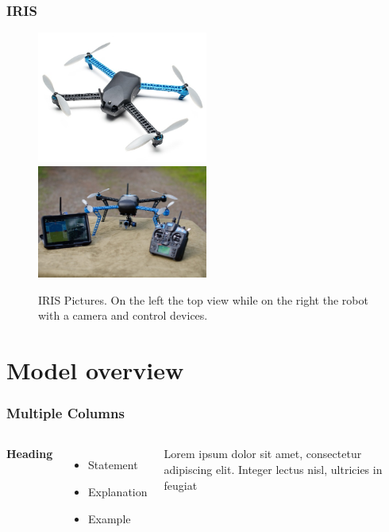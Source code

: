 \documentclass[xcolor=dvipsnames]{beamer}
\begin{document}
\begin{frame}
\frametitle{IRIS}
\begin{figure}
\centering
\includegraphics[width = 0.5\textwidth]{f/iris.jpg}
\includegraphics[width = 0.5\textwidth]{f/iris_planner.jpg}
\caption{IRIS Pictures. On the left the top view while on the right the robot with a camera and control devices.}
\end{figure}

\end{frame}
\section{Model overview}

\begin{frame}
\tableofcontents[sectionstyle=show,square,currentsection]
\end{frame}

\begin{frame}
\frametitle{Multiple Columns}
\begin{columns}[c] %

\textbf{Heading}
\begin{itemize}
\item Statement
\item Explanation
\item Example
\end{itemize}

Lorem ipsum dolor sit amet, consectetur adipiscing elit. Integer lectus nisl, ultricies in feugiat

\end{columns}
\end{frame}
\end{document}
